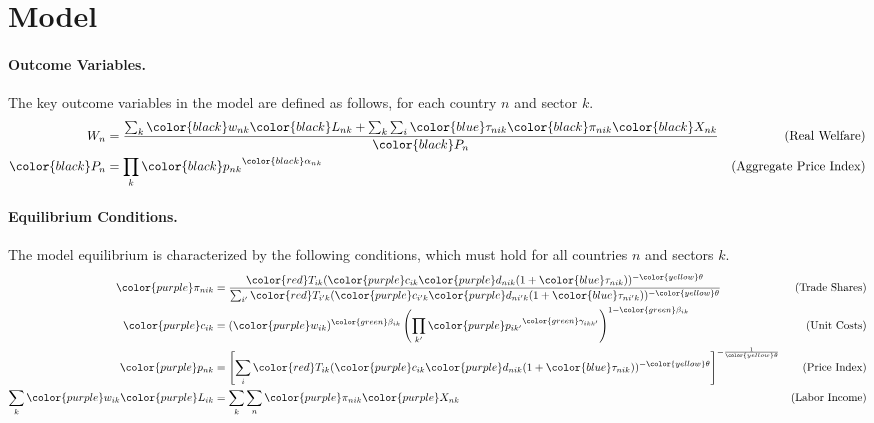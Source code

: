 \section{Model}
\paragraph{Outcome Variables.} The key outcome variables in the model are defined as follows, for each country $n$ and sector $k$.
\begin{align*}
    W_n &= \frac{\sum_{k} {\color{black}w_{nk}} {\color{black}L_{nk}} + \sum_{k} \sum_{i} {\color{blue}\tau_{nik}} {\color{black}\pi_{nik}} {\color{black}X_{nk}}}{{\color{black}P_n}} & \text{(Real Welfare)} \\
    {\color{black}P_n} &= \prod_{k} {\color{black}p_{nk}}^{{\color{black}\alpha_{nk}}} & \text{(Aggregate Price Index)}
\end{align*}

\paragraph{Equilibrium Conditions.} The model equilibrium is characterized by the following conditions, which must hold for all countries $n$ and sectors $k$.
\begin{align*}
    {\color{purple}\pi_{nik}} &= \frac{{\color{red}T_{ik}} ({\color{purple}c_{ik}} {\color{purple}d_{nik}} (1 + {\color{blue}\tau_{nik}}))^{-{\color{yellow}\theta}}}{\sum_{i'} {\color{red}T_{i'k}} ({\color{purple}c_{i'k}} {\color{purple}d_{ni'k}} (1 + {\color{blue}\tau_{ni'k}}))^{-{\color{yellow}\theta}}} & \text{(Trade Shares)} \\
    {\color{purple}c_{ik}} &= ({\color{purple}w_{ik}})^{{\color{green}\beta_{ik}}} \left(\prod_{k'} {\color{purple}p_{ik'}}^{{\color{green}\gamma_{ikk'}}}\right)^{1 - {\color{green}\beta_{ik}}} & \text{(Unit Costs)} \\
    {\color{purple}p_{nk}} &= \left[ \sum_{i} {\color{red}T_{ik}} ({\color{purple}c_{ik}} {\color{purple}d_{nik}} (1 + {\color{blue}\tau_{nik}}))^{-{\color{yellow}\theta}} \right]^{-\frac{1}{{\color{yellow}\theta}}} & \text{(Price Index)} \\
   \sum_{k} {\color{purple}w_{ik}} {\color{purple}L_{ik}} &= \sum_{k} \sum_{n} {\color{purple}\pi_{nik}} {\color{purple}X_{nk}} & \text{(Labor Income)}
\end{align*}


